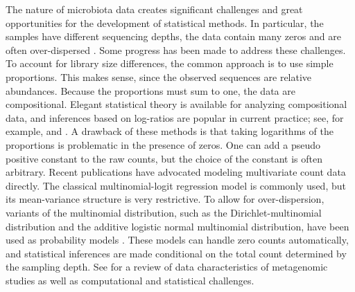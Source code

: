\documentclass[12pt]{article}
\begin{document}
The nature of microbiota data creates significant challenges and great opportunities for the development of statistical methods. In particular, the samples have different sequencing depths, the data contain many zeros and are often over-dispersed \citep{weiss2015effects}. Some progress has been made to address these challenges. To account for library size differences, the common approach is to use simple proportions. This makes sense, since the observed sequences are relative abundances. Because the proportions must sum to one, the data are compositional. Elegant statistical theory is available for analyzing compositional data, and inferences based on log-ratios are popular in current practice; see, for example, \citet{friedman2012inferring} and \citet{lin2014variable}. A drawback of these methods is that taking logarithms of the proportions is problematic in the presence of zeros. One can add a pseudo positive constant to the raw counts, but the choice of the constant is often arbitrary. Recent publications have advocated modeling multivariate count data directly. The classical multinomial-logit regression model is commonly used, but its mean-variance structure is very restrictive. To allow for over-dispersion, variants of the multinomial distribution, such as the Dirichlet-multinomial distribution and the additive logistic normal multinomial distribution, have been used as probability models \citep{chen2013variable, xia2013logistic}. These models can handle zero counts automatically, and statistical inferences are made conditional on the total count determined by the sampling depth. See \citet{li2015microbiome} for a review of data characteristics of metagenomic studies as well as computational and statistical challenges. %
\end{document}
